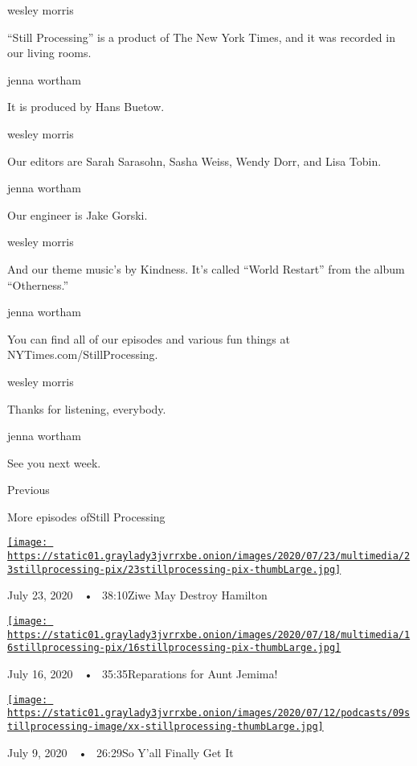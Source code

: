 wesley morris

``Still Processing'' is a product of The New York Times, and it was
recorded in our living rooms.

jenna wortham

It is produced by Hans Buetow.

wesley morris

Our editors are Sarah Sarasohn, Sasha Weiss, Wendy Dorr, and Lisa Tobin.

jenna wortham

Our engineer is Jake Gorski.

wesley morris

And our theme music's by Kindness. It's called ``World Restart'' from
the album ``Otherness.''

jenna wortham

You can find all of our episodes and various fun things at
NYTimes.com/StillProcessing.

wesley morris

Thanks for listening, everybody.

jenna wortham

See you next week.

Previous

More episodes ofStill Processing

\href{https://www.nytimes3xbfgragh.onion/2020/07/23/podcasts/hamilton-ziwe-discomfort.html?action=click\&module=audio-series-bar\&region=header\&pgtype=Article}{\texttt{[image: https://static01.graylady3jvrrxbe.onion/images/2020/07/23/multimedia/23stillprocessing-pix/23stillprocessing-pix-thumbLarge.jpg]}}

July 23, 2020~~•~ 38:10Ziwe May Destroy Hamilton

\href{https://www.nytimes3xbfgragh.onion/2020/07/16/podcasts/reparations-for-aunt-jemima.html?action=click\&module=audio-series-bar\&region=header\&pgtype=Article}{\texttt{[image: https://static01.graylady3jvrrxbe.onion/images/2020/07/18/multimedia/16stillprocessing-pix/16stillprocessing-pix-thumbLarge.jpg]}}

July 16, 2020~~•~ 35:35Reparations for Aunt Jemima!

\href{https://www.nytimes3xbfgragh.onion/2020/07/09/podcasts/still-processing-black-lives-matter.html?action=click\&module=audio-series-bar\&region=header\&pgtype=Article}{\texttt{[image: https://static01.graylady3jvrrxbe.onion/images/2020/07/12/podcasts/09stillprocessing-image/xx-stillprocessing-thumbLarge.jpg]}}

July 9, 2020~~•~ 26:29So Y'all Finally Get It

